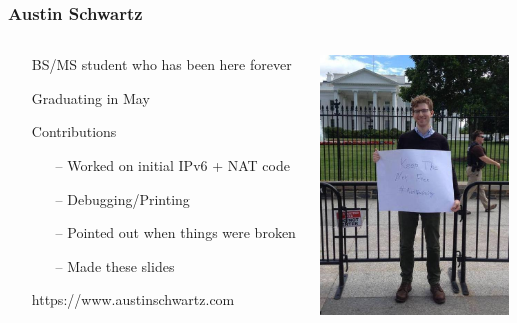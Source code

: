 \documentclass[professionalfonts, t, aspectratio=1610]{beamer}
\begin{document}
\renewcommand{\baselinestretch}{1.3}
\begin{frame} 
\frametitle{Austin Schwartz}
\bigskip
\begin{minipage}[0.2\textheight]{\textwidth}
\begin{columns}[T]
\begin{column}{0.6\textwidth}
\begin{itemize}
\item[\textbullet] BS/MS student who has been here forever
\item[\textbullet] Graduating in May
\item[\textbullet] Contributions
  \begin{itemize}
    \item[--] Worked on initial IPv6 + NAT code
    \item[--] Debugging/Printing
    \item[--] Pointed out when things were broken
    \item[--] Made these slides
  \end{itemize}
\item[\textbullet] https://www.austinschwartz.com
\end{itemize}
\end{column}
\begin{column}{0.4\textwidth}
\includegraphics[width=5cm]{austin.jpg}
\end{column}
\end{columns}
\end{minipage}

\end{frame}
\end{document}
